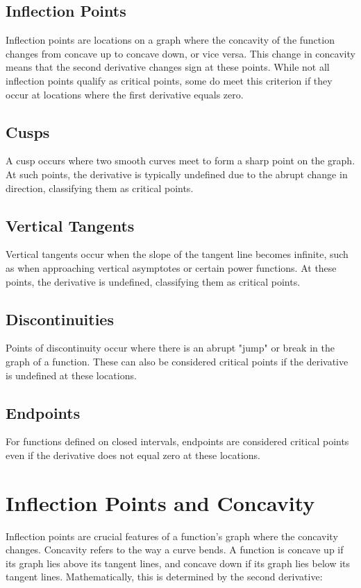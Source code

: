 \documentclass{article}
\begin{document}
\subsection{Inflection Points}
Inflection points are locations on a graph where the concavity of the function changes from concave up to concave down, or vice versa. This change in concavity means that the second derivative changes sign at these points. While not all inflection points qualify as critical points, some do meet this criterion if they occur at locations where the first derivative equals zero.

\subsection{Cusps}
A cusp occurs where two smooth curves meet to form a sharp point on the graph. At such points, the derivative is typically undefined due to the abrupt change in direction, classifying them as critical points.

\subsection{Vertical Tangents}
Vertical tangents occur when the slope of the tangent line becomes infinite, such as when approaching vertical asymptotes or certain power functions. At these points, the derivative is undefined, classifying them as critical points.

\subsection{Discontinuities}
Points of discontinuity occur where there is an abrupt "jump" or break in the graph of a function. These can also be considered critical points if the derivative is undefined at these locations.

\subsection{Endpoints}
For functions defined on closed intervals, endpoints are considered critical points even if the derivative does not equal zero at these locations.

\section{Inflection Points and Concavity}

Inflection points are crucial features of a function's graph where the concavity changes. Concavity refers to the way a curve bends. A function is concave up if its graph lies above its tangent lines, and concave down if its graph lies below its tangent lines. Mathematically, this is determined by the second derivative:
\end{document}
